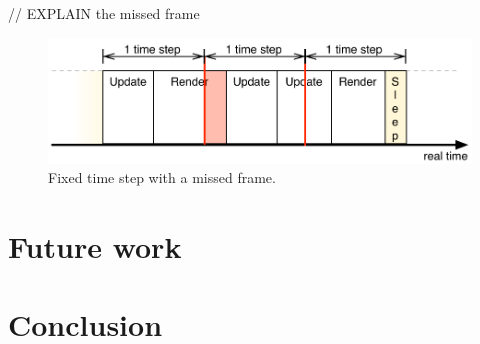 \documentclass[11pt,a4paper]{article}
\begin{document}
// EXPLAIN the missed frame


\begin{figure}[h]
\centering
\includegraphics[scale = 0.8]{images/missFrame} 
\caption{Fixed time step with a missed frame.}
\label{fig:missFrame}
\end{figure}

\section{Future work}


\section{Conclusion}
\end{document}

